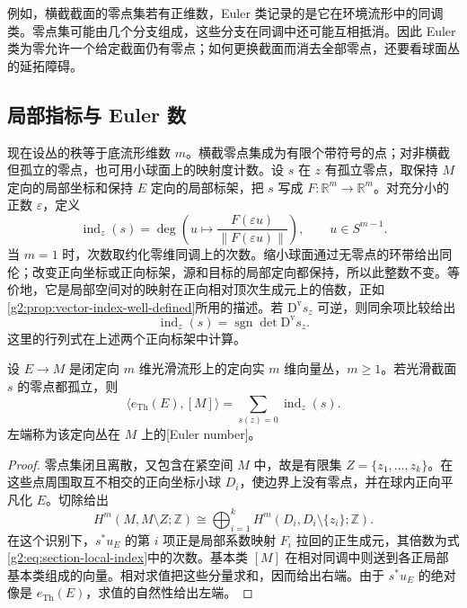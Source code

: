例如，横截截面的零点集若有正维数，Euler 类记录的是它在环境流形中的同调类。零点集可能由几个分支组成，这些分支在同调中还可能互相抵消。因此 Euler 类为零允许一个给定截面仍有零点；如何更换截面而消去全部零点，还要看球面丛的延拓障碍。

\subsection{局部指标与 Euler 数}
\label{g2:subsec:2003:03}
现在设丛的秩等于底流形维数 \(m\)。横截零点集成为有限个带符号的点；对非横截但孤立的零点，也可用小球面上的映射度计数。设 \(s\) 在 \(z\) 有孤立零点，取保持 \(M\) 定向的局部坐标和保持 \(E\) 定向的局部标架，把 \(s\) 写成 \(F:\mathbb R^m\to\mathbb R^m\)。对充分小的正数 \(\varepsilon\)，定义
\begin{equation}\label{g2:eq:section-local-index}
	\operatorname{ind}_z(s)=\deg\left(u\longmapsto\frac{F(\varepsilon u)}{\lVert F(\varepsilon u)\rVert}\right),
	\qquad u\in S^{m-1}.
\end{equation}
当 \(m=1\) 时，次数取约化零维同调上的次数。缩小球面通过无零点的环带给出同伦；改变正向坐标或正向标架，源和目标的局部定向都保持，所以此整数不变。等价地，它是局部空间对的映射在正向相对顶次生成元上的倍数，正如\cref{g2:prop:vector-index-well-defined}所用的描述。若 \(\mathrm D^{\mathrm v}s_z\) 可逆，则同余项比较给出
\[
	\operatorname{ind}_z(s)=\operatorname{sgn}\det\mathrm D^{\mathrm v}s_z.
\]
这里的行列式在上述两个正向标架中计算。

\begin{theorem}\label{g2:thm:euler-index-evaluation}
	设 \(E\to M\) 是闭定向 \(m\) 维光滑流形上的定向实 \(m\) 维向量丛，\(m\ge1\)。若光滑截面 \(s\) 的零点都孤立，则
	\begin{equation}\label{g2:eq:euler-index-evaluation}
		\langle e_{\mathrm{Th}}(E),[M]\rangle=\sum_{s(z)=0}\operatorname{ind}_z(s).
	\end{equation}
	左端称为该定向丛在 \(M\) 上的[Euler number]。
\end{theorem}
\begin{proof}
	零点集闭且离散，又包含在紧空间 \(M\) 中，故是有限集 \(Z=\{z_1,\ldots,z_k\}\)。在这些点周围取互不相交的正向坐标小球 \(D_i\)，使边界上没有零点，并在球内正向平凡化 \(E\)。切除给出
	\[
		H^m(M,M\setminus Z;\mathbb Z)
		\cong\bigoplus_{i=1}^kH^m(D_i,D_i\setminus\{z_i\};\mathbb Z).
	\]
	在这个识别下，\(s^*u_E\) 的第 \(i\) 项正是局部系数映射 \(F_i\) 拉回的正生成元，其倍数为式\eqref{g2:eq:section-local-index}中的次数。基本类 \([M]\) 在相对同调中则送到各正局部基本类组成的向量。相对求值把这些分量求和，因而给出右端。由于 \(s^*u_E\) 的绝对像是 \(e_{\mathrm{Th}}(E)\)，求值的自然性给出左端。
\end{proof}

